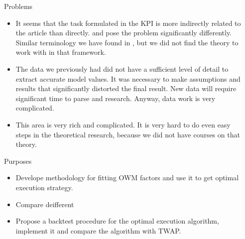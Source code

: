 \documentclass[]{beamer}
\begin{document}
\begin{frame}[t]
\begin{columns}[t]
    
    \begin{column}{\sepwid}\end{column} %
    
    \begin{column}{\onecolwid} %
    
        
        \begin{block}{Problems}
            \begin{itemize}
                \item It seems that the task formulated in the KPI is more indirectly related to the article \cite{obizhaeva2013optimal}
                than directly. \cite{obizhaeva2013optimal} and \cite{velu2020algorithmic} pose 
                the problem significantly differently. Similar terminology we have found in \cite{webster2023handbook}, but 
                we did not find the theory to work with in that framework.
                \item The data we previously had did not have a sufficient level of detail to extract accurate model values. 
                It was necessary to make assumptions and results that significantly distorted the final result. 
                New data will require significant time to parse and research. Anyway, data work is very complicated.
                \item This area is very rich and complicated. It is very hard to do even easy steps in the theoretical research, 
                because we did not have courses on that theory. 
                
            \end{itemize}

            
            \end{block}


        \begin{block}{Purposes}
        \begin{itemize}
            \item Develope methodology for fitting OWM factors and use it to get optimal execution strategy.
            \item Compare deifferent 
            \item Propose a backtest procedure for the optimal execution algorithm, implement it and compare the algorithm with TWAP.
        \end{itemize}
        

\end{block}
\end{column}
\end{columns}
\end{frame}
\end{document}
